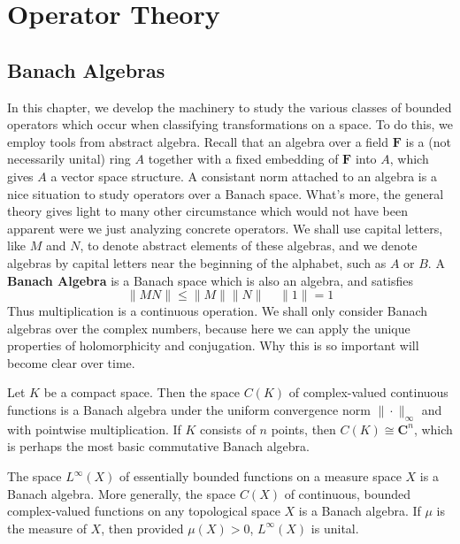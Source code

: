 







\part{Operator Theory}





\chapter{Banach Algebras}

In this chapter, we develop the machinery to study the various classes of bounded operators which occur when classifying transformations on a space. To do this, we employ tools from abstract algebra. Recall that an algebra over a field $\mathbf{F}$ is a (not necessarily unital) ring $A$ together with a fixed embedding of $\mathbf{F}$ into $A$, which gives $A$ a vector space structure. A consistant norm attached to an algebra is a nice situation to study operators over a Banach space. What's more, the general theory gives light to many other circumstance  which would not have been apparent were we just analyzing concrete operators. We shall use capital letters, like $M$ and $N$, to denote abstract elements of these algebras, and we denote algebras by capital letters near the beginning of the alphabet, such as $A$ or $B$. A {\bf Banach Algebra} is a Banach space which is also an algebra, and satisfies
%
\begin{equation} \label{algebranorm} \| MN \| \leq \| M \| \| N \|\ \ \ \ \ \| 1 \| = 1 \end{equation}
%
Thus multiplication is a continuous operation. We shall only consider Banach algebras over the complex numbers, because here we can apply the unique properties of holomorphicity and conjugation. Why this is so important will become clear over time.

\begin{example}
    Let $K$ be a compact space. Then the space $C(K)$ of complex-valued continuous functions is a Banach algebra under the uniform convergence norm $\| \cdot \|_\infty$ and with pointwise multiplication. If $K$ consists of $n$ points, then $C(K) \cong \mathbf{C}^n$, which is perhaps the most basic commutative Banach algebra.
\end{example}

\begin{example}
    The space $L^\infty(X)$ of essentially bounded functions on a measure space $X$ is a Banach algebra. More generally, the space $C(X)$ of continuous, bounded complex-valued functions on any topological space $X$ is a Banach algebra. If $\mu$ is the measure of $X$, then provided $\mu(X) > 0$, $L^\infty(X)$ is unital.
\end{example}

